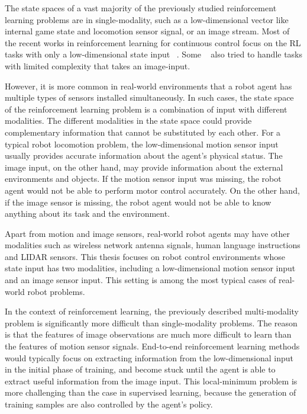 The state spaces of a vast majority of the previously studied reinforcement learning problems are in single-modality, such as a low-dimensional vector like internal game state and locomotion sensor signal, or an image stream. Most of the recent works in reinforcement learning for continuous control focus on the RL tasks with only a low-dimensional state input ~\cite{duan2016benchmarking}. Some ~\cite{wu2017scalable} also tried to handle tasks with limited complexity that takes an image-input.

However, it is more common in real-world environments that a robot agent has multiple types of sensors installed simultaneously. In such cases, the state space of the reinforcement learning problem is a combination of input with different modalities. The different modalities in the state space could provide complementary information that cannot be substituted by each other. For a typical robot locomotion problem, the low-dimensional motion sensor input usually provides accurate information about the agent's physical status. The image input, on the other hand, may provide information about the external environments and objects. If the motion sensor input was missing, the robot agent would not be able to perform motor control accurately. On the other hand, if the image sensor is missing, the robot agent would not be able to know anything about its task and the environment.


Apart from motion and image sensors, real-world robot agents may have other modalities such as wireless network antenna signals, human language instructions and LIDAR sensors. This thesis focuses on robot control environments whose state input has two modalities, including a low-dimensional motion sensor input and an image sensor input. This setting is among the most typical cases of real-world robot problems.

In the context of reinforcement learning, the previously described multi-modality problem is significantly more difficult than single-modality problems. The reason is that the features of image observations are much more difficult to learn than the features of motion sensor signals. End-to-end reinforcement learning methods would typically focus on extracting information from the low-dimensional input in the initial phase of training, and become stuck until the agent is able to extract useful information from the image input. This local-minimum problem is more challenging than the case in supervised learning, because the generation of training samples are also controlled by the agent's policy.

